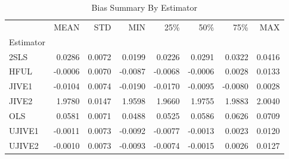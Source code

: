 \begin{table}[ht]
\centering
\caption{Bias Summary By Estimator}
\begin{tabular}{lrrrrrrr}
\toprule
 & MEAN & STD & MIN & 25\% & 50\% & 75\% & MAX \\
Estimator &  &  &  &  &  &  &  \\
\midrule
2SLS & 0.0286 & 0.0072 & 0.0199 & 0.0226 & 0.0291 & 0.0322 & 0.0416 \\
HFUL & -0.0006 & 0.0070 & -0.0087 & -0.0068 & -0.0006 & 0.0028 & 0.0133 \\
JIVE1 & -0.0104 & 0.0074 & -0.0190 & -0.0170 & -0.0095 & -0.0080 & 0.0028 \\
JIVE2 & 1.9780 & 0.0147 & 1.9598 & 1.9660 & 1.9755 & 1.9883 & 2.0040 \\
OLS & 0.0581 & 0.0071 & 0.0488 & 0.0525 & 0.0586 & 0.0626 & 0.0709 \\
UJIVE1 & -0.0011 & 0.0073 & -0.0092 & -0.0077 & -0.0013 & 0.0023 & 0.0120 \\
UJIVE2 & -0.0010 & 0.0073 & -0.0093 & -0.0074 & -0.0015 & 0.0026 & 0.0127 \\
\bottomrule
\end{tabular}
\end{table}
